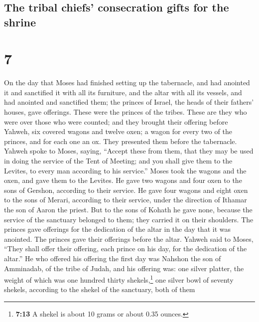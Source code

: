 \hypertarget{the-tribal-chiefs-consecration-gifts-for-the-shrine}{%
\subsection{The tribal chiefs' consecration gifts for the
shrine}\label{the-tribal-chiefs-consecration-gifts-for-the-shrine}}

\hypertarget{section-6}{%
\section{7}\label{section-6}}

 On the day that Moses had finished setting up the
tabernacle, and had anointed it and sanctified it with all its
furniture, and the altar with all its vessels, and had anointed and
sanctified them;  the princes of Israel, the heads of
their fathers' houses, gave offerings. These were the princes of the
tribes. These are they who were over those who were counted;
 and they brought their offering before Yahweh, six
covered wagons and twelve oxen; a wagon for every two of the princes,
and for each one an ox. They presented them before the tabernacle.
 Yahweh spoke to Moses, saying,  ``Accept
these from them, that they may be used in doing the service of the Tent
of Meeting; and you shall give them to the Levites, to every man
according to his service.''  Moses took the wagons and the
oxen, and gave them to the Levites.  He gave two wagons
and four oxen to the sons of Gershon, according to their service.
 He gave four wagons and eight oxen to the sons of Merari,
according to their service, under the direction of Ithamar the son of
Aaron the priest.  But to the sons of Kohath he gave none,
because the service of the sanctuary belonged to them; they carried it
on their shoulders.  The princes gave offerings for the
dedication of the altar in the day that it was anointed. The princes
gave their offerings before the altar.  Yahweh said to
Moses, ``They shall offer their offering, each prince on his day, for
the dedication of the altar.''  He who offered his
offering the first day was Nahshon the son of Amminadab, of the tribe of
Judah,  and his offering was: one silver platter, the
weight of which was one hundred thirty shekels,\footnote{\textbf{7:13} A
  shekel is about 10 grams or about 0.35 ounces.} one silver bowl of
seventy shekels, according to the shekel of the sanctuary, both of them

